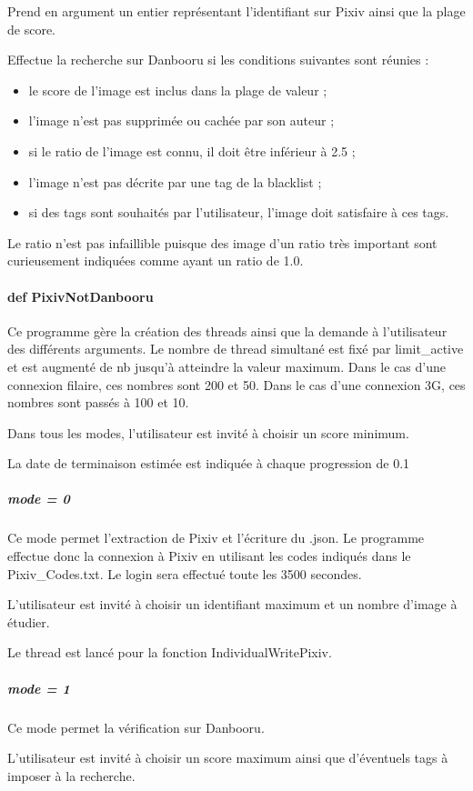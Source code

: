 \documentclass[a4paper,12pt]{article}
\begin{document}
Prend en argument un entier représentant l'identifiant sur Pixiv ainsi que la plage de score.

Effectue la recherche sur Danbooru si les conditions suivantes sont réunies :
\begin{itemize}
\item le score de l'image est inclus dans la plage de valeur ;
\item l'image n'est pas supprimée ou cachée par son auteur ;
\item si le ratio de l'image est connu, il doit être inférieur à 2.5 ;
\item l'image n'est pas décrite par une tag de la blacklist ;
\item si des tags sont souhaités par l'utilisateur, l'image doit satisfaire à ces tags.
\end{itemize}

Le ratio n'est pas infaillible puisque des image d'un ratio très important sont curieusement indiquées comme ayant un ratio de 1.0.
\paragraph{def PixivNotDanbooru}
Ce programme gère la création des threads ainsi que la demande à l'utilisateur des différents arguments. Le nombre de thread simultané est fixé par \og limit\_active \fg{} et est augmenté de \og nb \fg{} jusqu'à atteindre la valeur maximum. Dans le cas d'une connexion filaire, ces nombres sont 200 et 50. Dans le cas d'une connexion 3G, ces nombres sont passés à 100 et 10.

Dans tous les modes, l'utilisateur est invité à choisir un score minimum.

La date de terminaison estimée est indiquée à chaque progression de 0.1%
\subparagraph{mode = 0}
Ce mode permet l'extraction de Pixiv et l'écriture du .json. Le programme effectue donc la connexion à Pixiv en utilisant les codes indiqués dans le Pixiv\_Codes.txt. Le login sera effectué toute les 3500 secondes. 

L'utilisateur est invité à choisir un identifiant maximum et un nombre d'image à étudier.

Le thread est lancé pour la fonction IndividualWritePixiv.

\subparagraph{mode = 1}
Ce mode permet la vérification sur Danbooru.

L'utilisateur est invité à choisir un score maximum ainsi que d'éventuels tags à imposer à la recherche.
\end{document}
